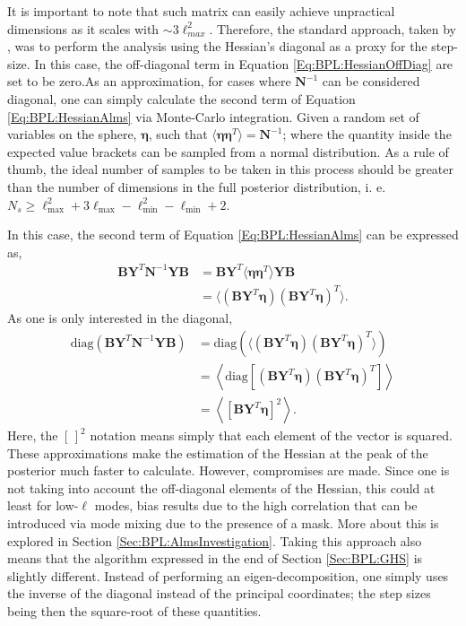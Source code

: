 \qquad It is important to note that such matrix can easily achieve unpractical dimensions as it scales with $\sim 3\ell_{max}^2$. Therefore, the standard approach, taken by \cite{SreeThesis}, was to perform the analysis using the Hessian's diagonal as a proxy for the step-size. In this case, the off-diagonal term in Equation \ref{Eq:BPL:HessianOffDiag} are set to be zero.As an approximation, for cases where $\mathbf{N}^{-1}$ can be considered diagonal, one can simply calculate the second term of Equation \ref{Eq:BPL:HessianAlms} via Monte-Carlo integration. Given a random set of variables on the sphere, $\bm{\eta}$, such that $\langle \bm{\eta} \bm{\eta}^T \rangle = \mathbf{N}^{-1}$; where the quantity inside the expected value brackets can be sampled from a normal distribution. As a rule of thumb, the ideal number of samples to be taken in this process should be greater than the number of dimensions in the full posterior distribution, i. e. $N_s \geq \ell_{\text{max}}^2 + 3\ell_{\text{max}} - \ell_{\text{min}}^2 - \ell_{\text{min}} + 2$. 

\qquad In this case, the second term of Equation \ref{Eq:BPL:HessianAlms} can be expressed as,
\begin{align}
    \mathbf{B}\mathbf{Y}^T\mathbf{N}^{-1}\mathbf{Y}\mathbf{B} & = \mathbf{B}\mathbf{Y}^T\langle \bm{\eta} \bm{\eta}^T \rangle\mathbf{Y}\mathbf{B} \\
    & = \langle (\mathbf{B}\mathbf{Y}^T\bm{\eta}) (\mathbf{B}\mathbf{Y}^T\bm{\eta})^T \rangle.
\end{align}
As one is only interested in the diagonal,
\begin{align}
    \text{diag}\left(\mathbf{B}\mathbf{Y}^T\mathbf{N}^{-1}\mathbf{Y}\mathbf{B}\right) & = \text{diag}\left(\langle (\mathbf{B}\mathbf{Y}^T\bm{\eta}) (\mathbf{B}\mathbf{Y}^T\bm{\eta})^T \rangle\right) \\
    & = \left\langle \text{diag} \left[ (\mathbf{B}\mathbf{Y}^T\bm{\eta}) (\mathbf{B}\mathbf{Y}^T\bm{\eta})^T \right] \right\rangle \\
    & = \left\langle \left[\mathbf{B}\mathbf{Y}^T\bm{\eta} \right]^2 \right\rangle.
\end{align}
Here, the $[\, ]^2$ notation means simply that each element of the vector is squared. These approximations make the estimation of the Hessian at the peak of the posterior much faster to calculate. However, compromises are made. Since one is not taking into account the off-diagonal elements of the Hessian, this could at least for low-$\ell$ modes, bias results due to the high correlation that can be introduced via mode mixing due to the presence of a mask. More about this is explored in Section \ref{Sec:BPL:AlmsInvestigation}. Taking this approach also means that the algorithm expressed in the end of Section \ref{Sec:BPL:GHS} is slightly different. Instead of performing an eigen-decomposition, one simply uses the inverse of the diagonal instead of the principal coordinates; the step sizes being then the square-root of these quantities.

